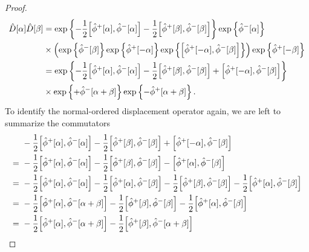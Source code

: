 \begin{proof}
\begin{equation*}
		\begin{split}
			\hat{D}[\alpha]
			\hat{D}[\beta]
			&=
			\exp\left\{
				-
				\frac{1}{2}
				\comm{\hat\phi^+[\alpha]}{\hat\phi^-[\alpha]}
				-
				\frac{1}{2}
				\comm{\hat\phi^+[\beta]}{\hat\phi^-[\beta]}
			\right\}
			\exp\left\{
				\hat\phi^-[\alpha]
			\right\}
			\\
			&\times
			\left(
				\exp\left\{
					\hat\phi^-[\beta]
				\right\}
				\exp\left\{
					\hat\phi^+[-\alpha]
				\right\}
				\exp\left\{
					\comm{\hat\phi^+[-\alpha]}{\hat\phi^-[\beta]}
				\right\}
			\right)
			\exp\left\{
				\hat\phi^+[-\beta]
			\right\}
			\\
			&=
			\exp\left\{
				-
				\frac{1}{2}
				\comm{\hat\phi^+[\alpha]}{\hat\phi^-[\alpha]}
				-
				\frac{1}{2}
				\comm{\hat\phi^+[\beta]}{\hat\phi^-[\beta]}
				+
				\comm{\hat\phi^+[-\alpha]}{\hat\phi^-[\beta]}
			\right\}
			\\
			&\times
			\exp\left\{
				+
				\hat\phi^-[\alpha+\beta]
			\right\}
			\exp\left\{
				-
				\hat\phi^+[\alpha+\beta]
			\right\}
			.
		\end{split}
	\end{equation*}
	To identify the normal-ordered displacement operator again, we are left to summarize the commutators
	\begin{equation*}
		\begin{split}
			&\
			-
			\frac{1}{2}
			\comm{\hat\phi^+[\alpha]}{\hat\phi^-[\alpha]}
			-
			\frac{1}{2}
			\comm{\hat\phi^+[\beta]}{\hat\phi^-[\beta]}
			+
			\comm{\hat\phi^+[-\alpha]}{\hat\phi^-[\beta]}
			\\
			=&\
			-
			\frac{1}{2}
			\comm{\hat\phi^+[\alpha]}{\hat\phi^-[\alpha]}
			-
			\frac{1}{2}
			\comm{\hat\phi^+[\beta]}{\hat\phi^-[\beta]}
			-
			\comm{\hat\phi^+[\alpha]}{\hat\phi^-[\beta]}
			\\
			=&\
			-
			\frac{1}{2}
			\comm{\hat\phi^+[\alpha]}{\hat\phi^-[\alpha]}
			-
			\frac{1}{2}
			\comm{\hat\phi^+[\alpha]}{\hat\phi^-[\beta]}
			-
			\frac{1}{2}
			\comm{\hat\phi^+[\beta]}{\hat\phi^-[\beta]}
			-
			\frac{1}{2}
			\comm{\hat\phi^+[\alpha]}{\hat\phi^-[\beta]}
			\\
			=&\
			-
			\frac{1}{2}
			\comm{\hat\phi^+[\alpha]}{\hat\phi^-[\alpha+\beta]}
			-
			\frac{1}{2}
			\comm{\hat\phi^+[\beta]}{\hat\phi^-[\beta]}
			-
			\frac{1}{2}
			\comm{\hat\phi^+[\alpha]}{\hat\phi^-[\beta]}
			\\
			=&\
			-
			\frac{1}{2}
			\comm{\hat\phi^+[\alpha]}{\hat\phi^-[\alpha+\beta]}
			-
			\frac{1}{2}
			\comm{\hat\phi^+[\beta]}{\hat\phi^-[\alpha+\beta]}

\end{split}
\end{equation*}
\end{proof}
